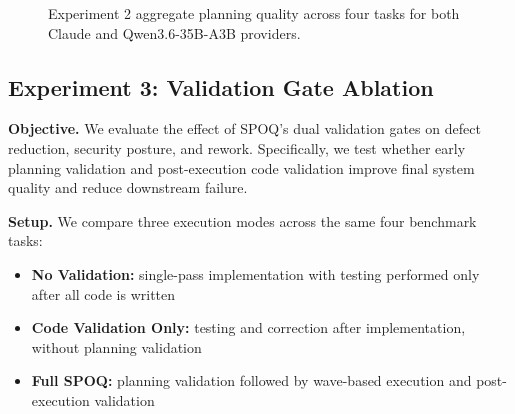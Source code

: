 \begin{figure}[t]
\centering
{}
\caption{Experiment 2 aggregate planning quality across four tasks for both Claude and Qwen3.6-35B-A3B providers.}
\label{fig:planning-quality}
\end{figure}

\subsection{Experiment 3: Validation Gate Ablation}

\textbf{Objective.}
We evaluate the effect of SPOQ's dual validation gates on defect reduction, security posture, and rework. Specifically, we test whether early planning validation and post-execution code validation improve final system quality and reduce downstream failure.

\textbf{Setup.}
We compare three execution modes across the same four benchmark tasks:

\begin{itemize}
    \item \textbf{No Validation:} single-pass implementation with testing performed only after all code is written
    \item \textbf{Code Validation Only:} testing and correction after implementation, without planning validation
    \item \textbf{Full SPOQ:} planning validation followed by wave-based execution and post-execution validation
\end{itemize}

